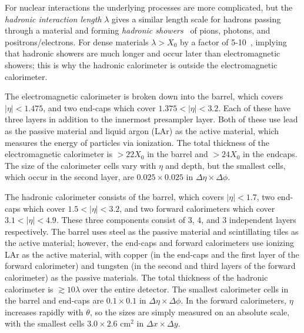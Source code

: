 For nuclear interactions the underlying processes are more complicated, but the \textit{hadronic interaction length} $\lambda$ gives a similar length scale for hadrons passing through a material and forming \textit{hadronic showers}~\cite{TASI_day3_school} of pions, photons, and positrons/electrons.
For dense materials $\lambda > X_0$ by a factor of 5-10~\cite{Lechner:2674116}, implying that hadronic showers are much longer and occur later than electromagnetic showers; this is why the hadronic calorimeter is outside the electromagnetic calorimeter.

The electromagnetic calorimeter is broken down into the barrel, which covers $|\eta|<1.475$, and two end-caps which cover $1.375<|\eta|<3.2$.
Each of these have three layers in addition to the innermost presampler layer.
Both of these use lead as the passive material and liquid argon (LAr) as the active material, which measures the energy of particles via ionization.
The total thickness of the electromagnetic calorimeter is $>22 X_0$ in the barrel and $>24 X_0$ in the endcaps.
The size of the calorimeter cells vary with $\eta$ and depth, but the smallest cells, which occur in the second layer, are $0.025 \times 0.025$ in $\Delta\eta \times \Delta\phi$.

The hadronic calorimeter consists of the barrel, which covers $|\eta|<1.7$, two end-caps which cover $1.5<|\eta|<3.2$, and two forward calorimeters which cover $3.1<|\eta|<4.9$.
These three components consist of 3, 4, and 3 independent layers respectively.
The barrel uses steel as the passive material and scintillating tiles as the active material; however, the end-caps and forward calorimeters use ionizing LAr as the active material, with copper (in the end-caps and the first layer of the forward calorimeter) and tungsten (in the second and third layers of the forward calorimeter) as the passive materials.
The total thickness of the hadronic calorimeter is $\gtrsim 10\lambda$ over the entire detector.
The smallest calorimeter cells in the barrel and end-caps are $0.1 \times 0.1$ in $\Delta\eta \times \Delta\phi$.
In the forward calorimeters, $\eta$ increases rapidly with $\theta$, so the sizes are simply measured on an absolute scale, with the smallest cells $3.0 \times 2.6$ $\text{cm}^2$ in $\Delta x \times \Delta y$.

